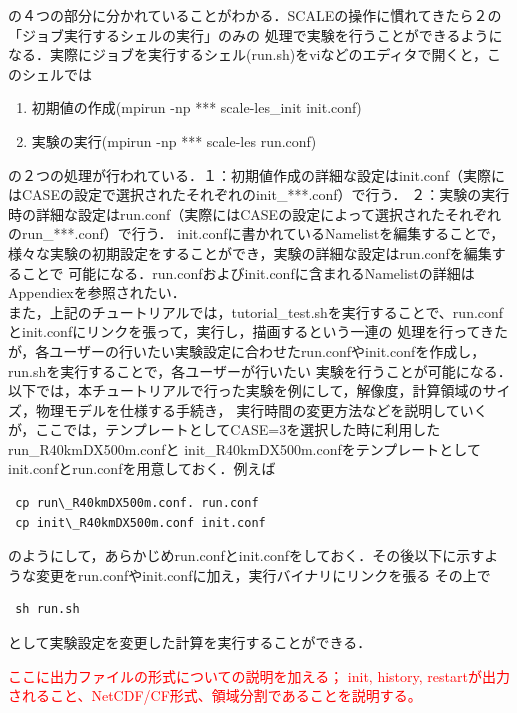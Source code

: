 の４つの部分に分かれていることがわかる．SCALEの操作に慣れてきたら２の「ジョブ実行するシェルの実行」のみの
処理で実験を行うことができるようになる．実際にジョブを実行するシェル(run.sh)をviなどのエディタで開くと，このシェルでは

\begin{enumerate}
\item 初期値の作成(mpirun -np *** scale-les\_init init.conf)
\item 実験の実行(mpirun -np *** scale-les run.conf)
\end{enumerate}

の２つの処理が行われている．１：初期値作成の詳細な設定はinit.conf（実際にはCASEの設定で選択されたそれぞれのinit\_***.conf）で行う．
２：実験の実行時の詳細な設定はrun.conf（実際にはCASEの設定によって選択されたそれぞれのrun\_***.conf）で行う．
init.confに書かれているNamelistを編集することで，様々な実験の初期設定をすることができ，実験の詳細な設定はrun.confを編集することで
可能になる．run.confおよびinit.confに含まれるNamelistの詳細はAppendiex\cite{appendixA2}を参照されたい．\\

また，上記のチュートリアルでは，tutorial\_test.shを実行することで、run.confとinit.confにリンクを張って，実行し，描画するという一連の
処理を行ってきたが，各ユーザーの行いたい実験設定に合わせたrun.confやinit.confを作成し，run.shを実行することで，各ユーザーが行いたい
実験を行うことが可能になる．以下では，本チュートリアルで行った実験を例にして，解像度，計算領域のサイズ，物理モデルを仕様する手続き，
実行時間の変更方法などを説明していくが，ここでは，テンプレートとしてCASE=3を選択した時に利用したrun\_R40kmDX500m.confと
init\_R40kmDX500m.confをテンプレートとしてinit.confとrun.confを用意しておく．例えば

\begin{verbatim}
 cp run\_R40kmDX500m.conf. run.conf
 cp init\_R40kmDX500m.conf init.conf
\end{verbatim}

のようにして，あらかじめrun.confとinit.confをしておく．その後以下に示すような変更をrun.confやinit.confに加え，実行バイナリにリンクを張る
その上で

\begin{verbatim}
 sh run.sh 
\end{verbatim}

として実験設定を変更した計算を実行することができる．

\textcolor{red}{\large ここに出力ファイルの形式についての説明を加える；
init, history, restartが出力されること、NetCDF/CF形式、領域分割であることを説明する。}

